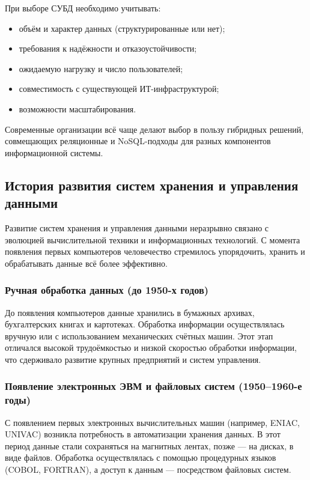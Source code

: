 При выборе СУБД необходимо учитывать:
\begin{itemize}
	\item объём и характер данных (структурированные или нет);
	\item требования к надёжности и отказоустойчивости;
	\item ожидаемую нагрузку и число пользователей;
	\item совместимость с существующей ИТ-инфраструктурой;
	\item возможности масштабирования.
\end{itemize}

Современные организации всё чаще делают выбор в пользу гибридных решений, совмещающих реляционные и NoSQL-подходы для разных компонентов информационной системы.

\subsection{История развития систем хранения и управления данными}

Развитие систем хранения и управления данными неразрывно связано с эволюцией вычислительной техники и информационных технологий. С момента появления первых компьютеров человечество стремилось упорядочить, хранить и обрабатывать данные всё более эффективно.

\subsubsection{Ручная обработка данных (до 1950-х годов)}

До появления компьютеров данные хранились в бумажных архивах, бухгалтерских книгах и картотеках. Обработка информации осуществлялась вручную или с использованием механических счётных машин. Этот этап отличался высокой трудоёмкостью и низкой скоростью обработки информации, что сдерживало развитие крупных предприятий и систем управления.

\subsubsection{Появление электронных ЭВМ и файловых систем (1950–1960-е годы)}

С появлением первых электронных вычислительных машин (например, ENIAC, UNIVAC) возникла потребность в автоматизации хранения данных. В этот период данные стали сохраняться на магнитных лентах, позже — на дисках, в виде файлов. Обработка осуществлялась с помощью процедурных языков (COBOL, FORTRAN), а доступ к данным — посредством файловых систем.

